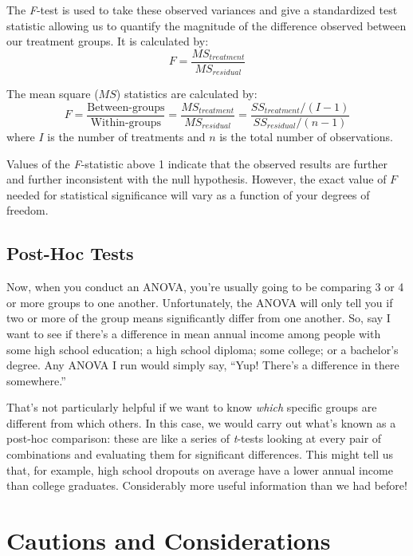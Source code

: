 The \textit{F}-test is used to take these observed variances and give a standardized test statistic allowing us to quantify the magnitude of the difference observed between our treatment groups. It is calculated by:
\begin{equation}
F = \frac{MS_{treatment}}{MS_{residual}}
\end{equation}

The mean square ($MS$) statistics are calculated by:
\begin{equation*}
F = \frac{\text{Between-groups}}{\text{Within-groups}} = \frac{MS_{treatment}}{MS_{residual}} = \frac{SS_{treatment}/(I-1)}{SS_{residual}/(n-1)}
\end{equation*}
where $I$ is the number of treatments and $n$ is the total number of observations.

Values of the \textit{F}-statistic above 1 indicate that the observed results are further and further inconsistent with the null hypothesis. However, the exact value of $F$ needed for statistical significance will vary as a function of your degrees of freedom.

\subsection{Post-Hoc Tests}

Now, when you conduct an ANOVA, you're usually going to be comparing 3 or 4 or more groups to one another. Unfortunately, the ANOVA will only tell you if two or more of the group means significantly differ from one another. So, say I want to see if there's a difference in mean annual income among people with some high school education; a high school diploma; some college; or a bachelor's degree. Any ANOVA I run would simply say, ``Yup! There's a difference in there somewhere.''

That's not particularly helpful if we want to know {\itshape which} specific groups are different from which others. In this case, we would carry out what's known as a post-hoc comparison: these are like a series of \textit{t}-tests looking at every pair of combinations and evaluating them for significant differences. This might tell us that, for example, high school dropouts on average have a lower annual income than college graduates. Considerably more useful information than we had before!

\section{Cautions and Considerations}

